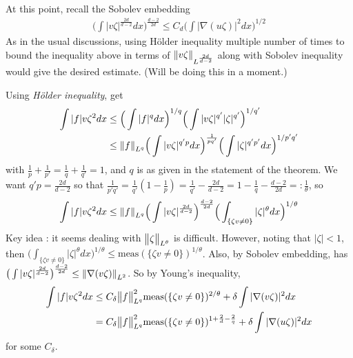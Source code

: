 \documentclass[12pt,a4paper]{article}
\newenvironment{proof}
{\begin{changemargin}{0.5cm}{0.5cm} 
	}%
	{\end{changemargin}
}
\newenvironment{p}
{\begin{proof} 
	}%
	{\end{proof}
}
\begin{document}
\begin{p}
At this point, recall the Sobolev embedding 
\begin{align*}
\Big( \int |v\zeta|^{\frac{2d}{d-2}} dx\Big)^{\frac{d-2}{2d}} \leq C_d \Big( \int |\nabla(u\zeta)|^2 dx \Big)^{1/2}
\end{align*}
As in the usual discussions, using H\"older inequality multiple number of times to bound the inequality above in terms of $\snorms{v\zeta}{L^{\frac{2d}{d-2}}}$ along with Sobolev inequality would give the desired estimate. (Will be doing this in a moment.)
\s

Using \emph{H\"older inequality}, get
\begin{align*}
\int |f| v\zeta^2 dx & \leq \Big( \int |f|^q dx\Big)^{1/q}\Big( \int |v \zeta|^{q'} |\zeta|^{q'} \Big)^{1/q'} \\
& \leq \snorms{f}{L^q} \Big( \int |v\zeta|^{q'p} dx \Big)^{\frac{1}{pq'}} \Big( \int |\zeta|^{q'p'} dx \Big)^{1/p'q'}
\end{align*}
with $\frac{1}{p}+ \frac{1}{p'} = \frac{1}{q} + \frac{1}{q'} =1$, and $q$ is as given in the statement of the theorem. We want $q'p = \frac{2d}{d-2}$ so that $\frac{1}{p'q'} = \frac{1}{q'}(1- \frac{1}{p}) = \frac{1}{q'} - \frac{2d}{d-2} = 1- \frac{1}{q}- \frac{d-2}{2d} =: \frac{1}{\theta}$, so
\begin{align*}
\int |f|v \zeta^2 dx \leq \snorms{f}{L^q} \Big( \int |v\zeta|^{\frac{2d}{d-2}} \Big)^{\frac{d-2}{2d}} \Big( \int_{\{\zeta v\neq 0\}} |\zeta|^{\theta} dx \Big)^{1/\theta}
\end{align*} 
Key idea : it seems dealing with $\bigl\lVert\zeta\bigr\rVert_{L^{\theta}}$ is difficult. However, noting that $|\zeta| <1$, then $\big( \int_{\{\zeta v\neq 0\}} |\zeta|^{\theta} dx \big)^{1/\theta} \leq \text{meas}(\{\zeta v\neq 0\})^{1/\theta}$. Also, by Sobolev embedding, has $\big( \int |v\zeta|^{\frac{2d}{d-2}} \big)^{\frac{d-2}{2d}} \leq \snorms{\nabla(v\zeta)}{L^2}$. So by Young's inequality,
\begin{align*}
\int |f|v \zeta^2 dx & \leq C_{\delta} \bigl\lVert f\bigr\rVert_{L^q}^2 \text{meas}(\{\zeta v\neq 0\})^{2/\theta} + \delta \int |\nabla (v\zeta)|^2 dx \\
& = C_{\delta} \bigl\lVert f\bigr\rVert_{L^q}^2 \text{meas}(\{\zeta v\neq 0\})^{1+ \frac{2}{d} - \frac{2}{q}} + \delta \int |\nabla(u\zeta)|^2 dx 
\end{align*}
for some $C_{\delta}$.
\s


\end{p}
\end{document}
